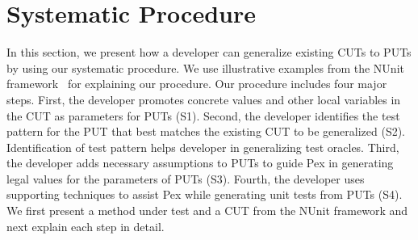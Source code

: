 \section{Systematic Procedure}
\label{sec:procedure}

In this section, we present how a developer can generalize existing CUTs to PUTs by using our systematic procedure. We use illustrative examples from the NUnit framework~\cite{nunit} for explaining our procedure. Our procedure includes four major steps. First, the developer promotes concrete values and other local variables in the CUT as parameters for PUTs (S1). Second, the developer identifies the test pattern for the PUT that best matches the existing CUT to be generalized (S2). Identification of test pattern helps developer in generalizing test oracles. Third, the developer adds necessary assumptions to PUTs to guide Pex in generating legal values for the parameters of PUTs (S3). Fourth, the developer uses supporting techniques to assist Pex while generating unit tests from PUTs (S4). We first present a method under test and a CUT from the NUnit framework and next explain each step in detail.

